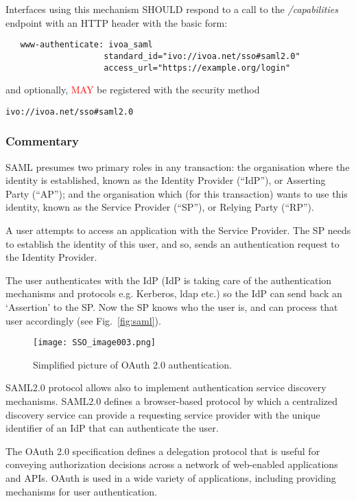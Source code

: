 \documentclass[11pt,a4paper]{ivoa}
\begin{document}
Interfaces using this mechanism SHOULD respond to a call to the 
\emph{/capabilities} endpoint with an HTTP header with the basic form:
\begin{verbatim}
   www-authenticate: ivoa_saml 
                    standard_id="ivo://ivoa.net/sso#saml2.0"
                    access_url="https://example.org/login"
\end{verbatim}

and optionally, \textcolor{red}{MAY} be registered with the security
method

\texttt{ivo://ivoa.net/sso\#saml2.0}


\subsubsection{Commentary}
SAML presumes two primary roles in any transaction: the organisation
where the identity is established,
known as the Identity Provider (``IdP''), or Asserting Party (``AP'');
and the organisation which (for this transaction) wants to use this
identity, known as the Service Provider (``SP''),
or Relying Party (``RP'').

A user attempts to access an application with the Service Provider.
The SP needs to establish the identity of this user, and so, sends an
authentication request to the Identity Provider.

The user authenticates with the IdP (IdP is taking care of the
authentication mechanisms and protocols e.g. Kerberos, ldap etc.) so the
IdP can send back an `Assertion' to the SP.
Now the SP knows who the user is, and can process that user accordingly
(see Fig.~\ref{fig:saml}).
\begin{figure}
\centering
\texttt{[image: SSO\_image003.png]}
\caption{Simplified picture of OAuth 2.0 authentication.}
\label{fig:oauth}
\end{figure}

SAML2.0 protocol allows also to implement authentication service
discovery mechanisms. SAML2.0  defines a browser-based protocol
by which a centralized discovery service can provide a requesting
service provider with the unique identifier of an
IdP that can authenticate the user.

The OAuth 2.0 specification defines a delegation protocol that is useful
for conveying authorization decisions across a network of web-enabled
applications and APIs. OAuth is used in a wide variety of applications,
including providing mechanisms for user authentication.
\end{document}
